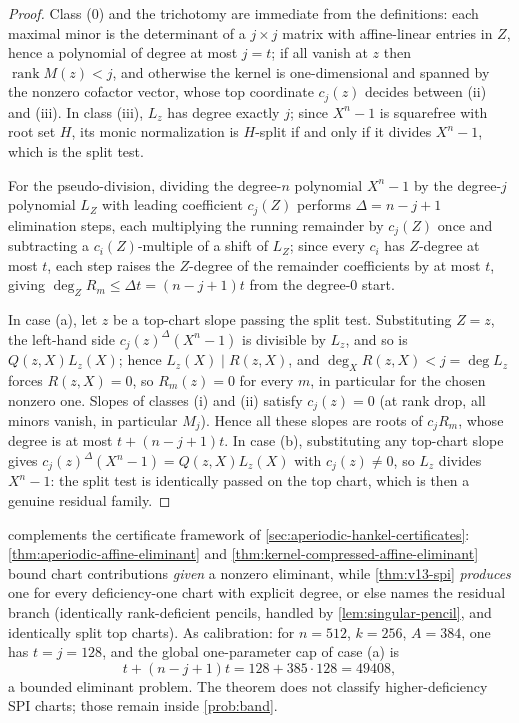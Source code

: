 \begin{proof}
Class \textup{(0)} and the trichotomy are immediate from the definitions: each maximal minor is the determinant of a $j\times j$ matrix with affine-linear entries in $Z$, hence a polynomial of degree at most $j=t$; if all vanish at $z$ then $\operatorname{rank}M(z)<j$, and otherwise the kernel is one-dimensional and spanned by the nonzero cofactor vector, whose top coordinate $c_j(z)$ decides between \textup{(ii)} and \textup{(iii)}.  In class \textup{(iii)}, $L_z$ has degree exactly $j$; since $X^n-1$ is squarefree with root set $H$, its monic normalization is $H$-split if and only if it divides $X^n-1$, which is the split test.

For the pseudo-division, dividing the degree-$n$ polynomial $X^n-1$ by the degree-$j$ polynomial $L_Z$ with leading coefficient $c_j(Z)$ performs $\Delta=n-j+1$ elimination steps, each multiplying the running remainder by $c_j(Z)$ once and subtracting a $c_i(Z)$-multiple of a shift of $L_Z$; since every $c_i$ has $Z$-degree at most $t$, each step raises the $Z$-degree of the remainder coefficients by at most $t$, giving $\deg_ZR_m\le\Delta t=(n-j+1)t$ from the degree-$0$ start.

In case \textup{(a)}, let $z$ be a top-chart slope passing the split test.  Substituting $Z=z$, the left-hand side $c_j(z)^\Delta(X^n-1)$ is divisible by $L_z$, and so is $Q(z,X)L_z(X)$; hence $L_z(X)\mid R(z,X)$, and $\deg_XR(z,X)<j=\deg L_z$ forces $R(z,X)=0$, so $R_m(z)=0$ for every $m$, in particular for the chosen nonzero one.  Slopes of classes \textup{(i)} and \textup{(ii)} satisfy $c_j(z)=0$ \textup(at rank drop, all minors vanish, in particular $M_j$\textup).  Hence all these slopes are roots of $c_jR_m$, whose degree is at most $t+(n-j+1)t$.  In case \textup{(b)}, substituting any top-chart slope gives $c_j(z)^\Delta(X^n-1)=Q(z,X)L_z(X)$ with $c_j(z)\ne0$, so $L_z$ divides $X^n-1$: the split test is identically passed on the top chart, which is then a genuine residual family.
\end{proof}

\begin{remark}\label{rem:v13-spi-calibration}
 complements the certificate framework of \cref{sec:aperiodic-hankel-certificates}: \cref{thm:aperiodic-affine-eliminant} and \cref{thm:kernel-compressed-affine-eliminant} bound chart contributions \emph{given} a nonzero eliminant, while \cref{thm:v13-spi} \emph{produces} one for every deficiency-one chart with explicit degree, or else names the residual branch \textup(identically rank-deficient pencils, handled by \cref{lem:singular-pencil}, and identically split top charts\textup).  As calibration: for $n=512$, $k=256$, $A=384$, one has $t=j=128$, and the global one-parameter cap of case \textup{(a)} is
\[
        t+(n-j+1)t=128+385\cdot128=49408,
\]
a bounded eliminant problem.  The theorem does not classify higher-deficiency SPI charts; those remain inside \cref{prob:band}.
\end{remark}


